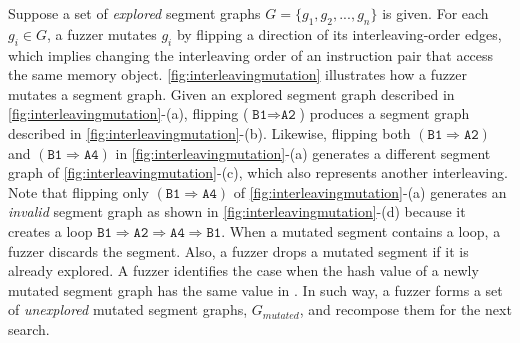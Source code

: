%
Suppose a set of \textit{explored} segment graphs
$G = \{g_1, g_2, ..., g_n \}$ is given.
%
For each $g_i \in G$, a fuzzer mutates $g_i$ by flipping a direction 
of its interleaving-order edges, which implies changing 
the interleaving order of an instruction pair that access the same 
memory object.
%
\autoref{fig:interleavingmutation} illustrates how a fuzzer mutates a
segment graph.
%
Given an explored segment graph described in
\autoref{fig:interleavingmutation}-(a), flipping
($\texttt{B1} \Rightarrow \texttt{A2}$) produces a segment graph
described in \autoref{fig:interleavingmutation}-(b).
%
%
Likewise, flipping both $(\texttt{B1} \Rightarrow \texttt{A2})$ and
$(\texttt{B1} \Rightarrow \texttt{A4})$ in
\autoref{fig:interleavingmutation}-(a) generates a different segment graph
of \autoref{fig:interleavingmutation}-(c), which also represents
another interleaving.
%
Note that flipping only
$(\texttt{B1} \Rightarrow \texttt{A4})$  of
\autoref{fig:interleavingmutation}-(a) generates an \textit{invalid}
segment graph as shown in \autoref{fig:interleavingmutation}-(d)
because it creates a loop
$\texttt{B1} \Rightarrow \texttt{A2} \Rightarrow \texttt{A4}
\Rightarrow \texttt{B1}$.
%
%
When a mutated segment contains a loop, a fuzzer discards the segment.
%
Also, a fuzzer drops a mutated segment if it is already explored. A fuzzer
identifies the case when the hash value of a newly mutated segment graph
has the same value in \intcov.
%
In such way, a fuzzer forms a set of \textit{unexplored} mutated
segment graphs, $G_{mutated}$, and recompose them for the next search.

